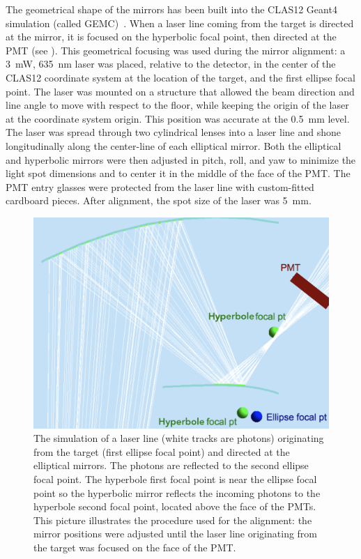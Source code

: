 The geometrical shape of the mirrors has been built into the CLAS12 Geant4 simulation (called GEMC)~\cite{sim-nim}.
When a laser line coming from the target is directed at the mirror, it is focused on the hyperbolic focal point, then
directed at the PMT (see ). This geometrical focusing was used during the mirror alignment:
a 3~mW, 635~nm laser was placed, relative to the detector, in the center of the CLAS12 coordinate system at the
location of the target, and the first ellipse focal point. The laser was mounted on a structure that allowed the beam
direction and line angle to move with respect to the floor, while keeping the origin of the laser at the coordinate
system origin. This position was accurate at the 0.5~mm level. The laser was spread through two cylindrical lenses into
a laser line and shone longitudinally along the center-line of each elliptical mirror. Both the elliptical and hyperbolic
mirrors were then adjusted in pitch, roll, and yaw to minimize the light spot dimensions and to center it in the middle
of the face of the PMT. The PMT entry glasses were protected from the laser line with custom-fitted cardboard
pieces. After alignment, the spot size of the laser was 5~mm.

\begin{figure}
\centering
	\includegraphics[width=0.85\columnwidth, height=0.75\columnwidth]{img/mirrorAlignmentSimulationZoomed.png}
	\caption{The simulation of a laser line (white tracks are photons) originating from the target (first ellipse focal
          point) and directed at the elliptical mirrors. The photons are reflected to the second ellipse focal point. The
          hyperbole first focal point is near the ellipse focal point so the hyperbolic mirror reflects the incoming photons
          to the hyperbole second focal point, located above the face of the PMTs. This picture illustrates the procedure
          used for the alignment: the mirror positions were adjusted until the laser line originating from the target was
          focused on the face of the PMT.}
	\label{fig:alignmentSimulation}
\end{figure}

